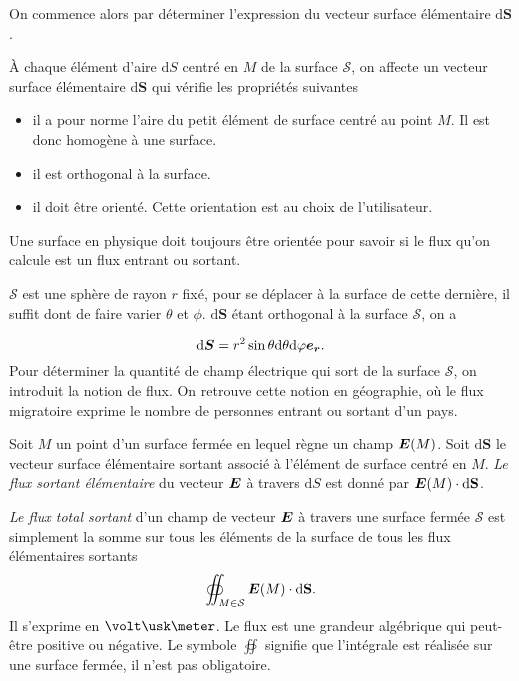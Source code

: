 On commence alors par déterminer 
l'expression du vecteur surface élémentaire $\mathrm{d}\mathbf{S}$. 

\begin{defn}
	À chaque élément d'aire $\mathrm{d}S$ centré en $M$ de la surface $\mathcal{S}$, 
	on  affecte un vecteur surface élémentaire $\mathrm{d}\mathbf{S}$ 
	qui vérifie les propriétés suivantes
	\begin{itemize}
		\item il a pour norme l'aire du petit élément de surface centré 
		  au point $M$. Il est donc homogène à une surface.
		\item il est orthogonal à la surface.
		\item il doit être orienté. Cette orientation est au choix de 
		  l'utilisateur.
	\end{itemize}
\end{defn}

\begin{attention}
	Une surface en physique doit toujours être orientée pour savoir
	si le flux qu'on calcule est un flux entrant ou sortant.
\end{attention}

$\mathcal{S}$ est une sphère de rayon $r$ fixé, pour se déplacer à la surface 
de cette dernière, 
il suffit dont de faire varier $\theta$ et $\phi$. $\mathrm{d}\mathbf{S}$ 
étant orthogonal à la surface $\mathcal{S}$, on a

\begin{equation*}
	\ds = r^2 \sin \theta \dtheta \dphi \er.
\end{equation*}
Pour déterminer la quantité de champ électrique qui sort de la surface 
$\mathcal{S}$, on introduit la notion de flux. On retrouve cette notion en géographie,
 où le flux migratoire exprime le nombre de personnes entrant ou sortant d'un 
 pays.

\begin{defn}
	Soit $M$ un point d'un surface fermée en lequel règne un champ $\vece(M)$.
	Soit $\mathrm{d}\mathbf{S}$ le vecteur surface élémentaire sortant associé
	à l'élément de surface centré en $M$. \emph{Le flux sortant élémentaire} du 
	vecteur $\vece$ à travers $\mathrm{d}S$ est donné par
	$\vece(M) \cdot \mathrm{d}\mathbf{S}$.

	\emph{Le flux total sortant} d'un champ de vecteur $\vece$ à travers 
	une surface fermée
	$\mathcal{S}$ est simplement la somme sur tous les éléments de la surface de tous
	les flux élémentaires sortants
	\begin{equation}
		\oiint_{M \in \mathcal{S}} \vece(M) \cdot \mathrm{d}\mathbf{S}.
	\end{equation}
	Il s'exprime en $\volt \usk \meter$. Le flux est une grandeur algébrique
	qui peut-être positive ou négative. Le symbole $\oiint$ signifie que
	l'intégrale est réalisée sur une surface fermée, il n'est pas obligatoire.
\end{defn}


